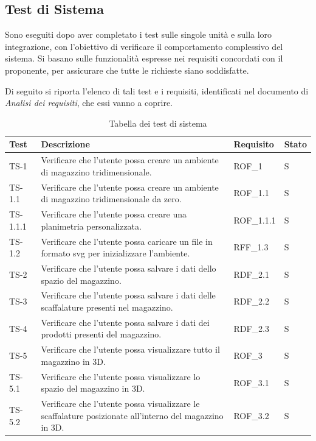 \subsection{Test di Sistema}
\par Sono eseguiti dopo aver completato i test sulle singole unità e sulla loro integrazione, con l'obiettivo di verificare il comportamento complessivo del sistema. Si basano sulle funzionalità espresse nei requisiti concordati con il proponente, per assicurare che tutte le richieste siano soddisfatte.

Di seguito si riporta l'elenco di tali test e i requisiti, identificati nel documento di \textit{Analisi dei requisiti}, che essi vanno a coprire.
\renewcommand{\arraystretch}{1.5}
\begin{xltabular}{0.9\textwidth}{X | p{0.5\textwidth} | X | p{0.9cm}}
    \textbf{\color{white} Test} & \textbf{\color{white} Descrizione} & \textbf{\color{white} Requisito} & \textbf{\color{white} Stato}\\ 
    \hline
    \endhead
    \caption{Tabella dei test di sistema} 
    \label{tab:test_sistema}
    \endlastfoot
    TS-1 & Verificare che l'utente possa creare un ambiente di magazzino tridimensionale. & ROF\_1 & S\\
    TS-1.1 & Verificare che l'utente possa creare un ambiente di magazzino tridimensionale da zero. & ROF\_1.1 & S\\
    TS-1.1.1 & Verificare che l'utente possa creare una planimetria personalizzata. & ROF\_1.1.1 & S\\
    TS-1.2 & Verificare che l'utente possa caricare un file in formato svg per inizializzare l'ambiente. & RFF\_1.3 & S \\
    TS-2 & Verificare che l'utente possa salvare i dati dello spazio del magazzino.& RDF\_2.1 & S   \\
    TS-3 & Verificare che l'utente possa salvare i dati delle scaffalature presenti nel magazzino. & RDF\_2.2& S   \\
    TS-4 & Verificare che l'utente possa salvare i dati dei prodotti presenti del magazzino. & RDF\_2.3& S     \\
    TS-5 & Verificare che l'utente possa visualizzare tutto il magazzino in 3D.& ROF\_3 & S\\
    TS-5.1 & Verificare che l'utente possa visualizzare lo spazio del magazzino in 3D. & ROF\_3.1& S\\
    TS-5.2 & Verificare che l'utente possa visualizzare le scaffalature posizionate all'interno del magazzino in 3D. & ROF\_3.2& S\\

\end{xltabular}
